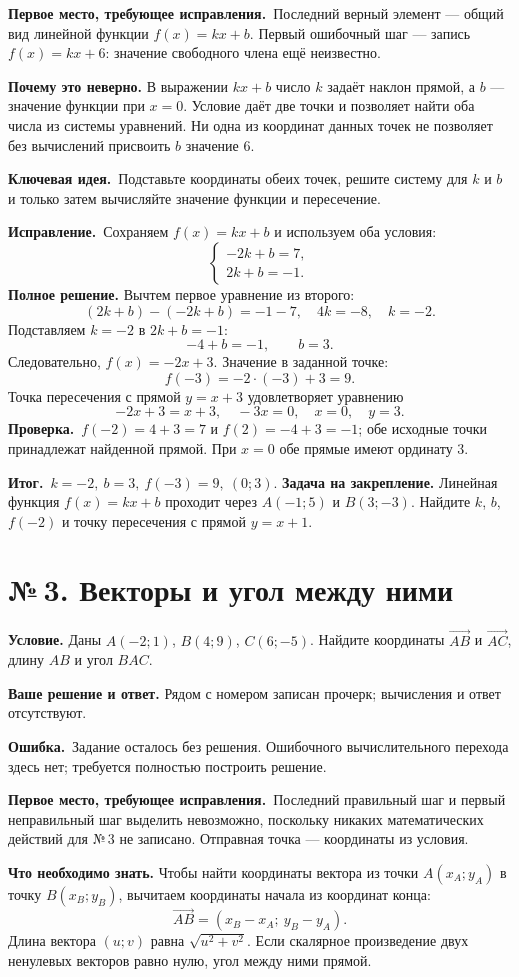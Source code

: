 \documentclass[a4paper,12pt]{article}
\newcommand{\errlabel}{\textcolor{err}{\textbf{Ошибка.}}}
\newcommand{\keylabel}{\textcolor{accent}{\textbf{Ключевая идея.}}}
\newcommand{\resultlabel}{\textcolor{accent}{\textbf{Итог.}}}
\newcommand{\reviewtask}[2]{\clearpage\phantomsection\label{task:#1}\section*{\textcolor{accent}{№\,#1. #2}}}
\newcommand{\firstwrong}{\textbf{Первое место, требующее исправления.}}
\newcommand{\fix}{\textbf{Исправление.}}
\newcommand{\verify}{\textbf{Проверка.}}
\newcommand{\practice}{\medskip\textbf{Задача на закрепление.} }
\begin{document}
\firstwrong\ Последний верный элемент --- общий вид линейной функции $f(x)=kx+b$. Первый ошибочный шаг --- запись $f(x)=kx+6$: значение свободного члена ещё неизвестно.

\textbf{Почему это неверно.} В выражении $kx+b$ число $k$ задаёт наклон прямой, а $b$ --- значение функции при $x=0$. Условие даёт две точки и позволяет найти оба числа из системы уравнений. Ни одна из координат данных точек не позволяет без вычислений присвоить $b$ значение $6$.

\keylabel\ Подставьте координаты обеих точек, решите систему для $k$ и $b$ и только затем вычисляйте значение функции и пересечение.

\fix\ Сохраняем $f(x)=kx+b$ и используем оба условия:
\[
\begin{cases}-2k+b=7,\\2k+b=-1.\end{cases}
\]
\textbf{Полное решение.} Вычтем первое уравнение из второго:
\[
(2k+b)-(-2k+b)=-1-7,
\quad4k=-8,\quad k=-2.
\]
Подставляем $k=-2$ в $2k+b=-1$:
\[
-4+b=-1,\qquad b=3.
\]
Следовательно, $f(x)=-2x+3$. Значение в заданной точке:
\[
f(-3)=-2\cdot(-3)+3=9.
\]
Точка пересечения с прямой $y=x+3$ удовлетворяет уравнению
\[
-2x+3=x+3,\quad -3x=0,\quad x=0,\quad y=3.
\]
\verify\ $f(-2)=4+3=7$ и $f(2)=-4+3=-1$; обе исходные точки принадлежат найденной прямой. При $x=0$ обе прямые имеют ординату $3$.

\resultlabel\ $\boxed{k=-2,\ b=3,\ f(-3)=9,\ (0;3)}$.
\practice Линейная функция $f(x)=kx+b$ проходит через $A(-1;5)$ и $B(3;-3)$. Найдите $k$, $b$, $f(-2)$ и точку пересечения с прямой $y=x+1$.

\reviewtask{3}{Векторы и угол между ними}
\textbf{Условие.} Даны $A(-2;1)$, $B(4;9)$, $C(6;-5)$. Найдите координаты $\overrightarrow{AB}$ и $\overrightarrow{AC}$, длину $AB$ и угол $BAC$.

\textbf{Ваше решение и ответ.} Рядом с номером записан прочерк; вычисления и ответ отсутствуют.

\errlabel\ Задание осталось без решения. Ошибочного вычислительного перехода здесь нет; требуется полностью построить решение.

\firstwrong\ Последний правильный шаг и первый неправильный шаг выделить невозможно, поскольку никаких математических действий для №\,3 не записано. Отправная точка --- координаты из условия.

\textbf{Что необходимо знать.} Чтобы найти координаты вектора из точки $A(x_A;y_A)$ в точку $B(x_B;y_B)$, вычитаем координаты начала из координат конца:
\[
\overrightarrow{AB}=(x_B-x_A;\ y_B-y_A).
\]
Длина вектора $(u;v)$ равна $\sqrt{u^2+v^2}$. Если скалярное произведение двух ненулевых векторов равно нулю, угол между ними прямой.
\end{document}
